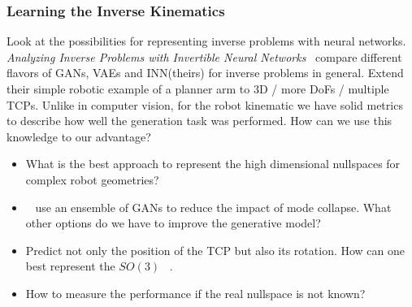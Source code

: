 \documentclass[a4paper]{article}
\begin{document}

\subsubsection{Learning the Inverse Kinematics}
Look at the possibilities for representing inverse problems with neural networks.
\textit{Analyzing Inverse Problems with Invertible Neural Networks}~\cite{Ardizzone2018}
compare different flavors of GANs, VAEs and INN(theirs) for inverse problems in general.
Extend their simple robotic example of a planner arm to 3D / more DoFs / multiple TCPs.
Unlike in computer vision, for the robot kinematic we have solid metrics to describe how well the generation task was performed.
How can we use this knowledge to our advantage?

\begin{itemize}
  \item What is the best approach to represent the high dimensional nullspaces for complex robot geometries?
  \item ~\cite{Lembono2021} use an ensemble of GANs to reduce the impact of mode collapse.
        What other options do we have to improve the generative model?
  \item Predict not only the position of the TCP but also its rotation. 
  How can one best represent the $SO(3)$ ~\cite{Zhou2018}.
  \item How to measure the performance if the real nullspace is not known?
\end{itemize}
\end{document}
